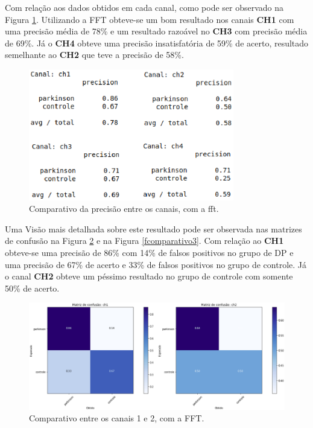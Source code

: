 Com relação aos dados obtidos em cada canal, como pode ser observado na Figura \ref{fcomparativo1}. Utilizando a FFT obteve-se um bom resultado nos canais \textbf{CH1} com uma precisão média de 78\% e um resultado razoável no \textbf{CH3} com precisão média de 69\%. Já o \textbf{CH4} obteve uma precisão insatisfatória de  59\% de acerto, resultado semelhante ao \textbf{CH2} que teve a precisão de 58\%.

\begin{figure}[t]
    \centering
    \includegraphics[width=0.8\textwidth]{figuras/fcomparativo.eps}
    \caption{Comparativo da precisão entre os canais, com a fft.}
    \label{fcomparativo1}
\end{figure}

Uma Visão mais detalhada sobre este resultado pode ser observada nas matrizes de confusão na Figura \ref{fcomparativo2} e na Figura \ref{fcomparativo3}. Com relação ao \textbf{CH1} obteve-se uma precisão de 86\% com 14\% de falsos positivos no grupo de DP e uma precisão de 67\% de acerto e 33\% de falsos positivos no grupo de controle. Já o canal \textbf{CH2} obteve um péssimo resultado no grupo de controle com somente 50\% de acerto. 

\begin{figure}[!t]
    \centering
    \includegraphics[width=1.1\textwidth]{figuras/CH12Comp.eps}
    \caption{Comparativo entre os canais 1 e 2, com a FFT.}
    \label{fcomparativo2}
\end{figure}

